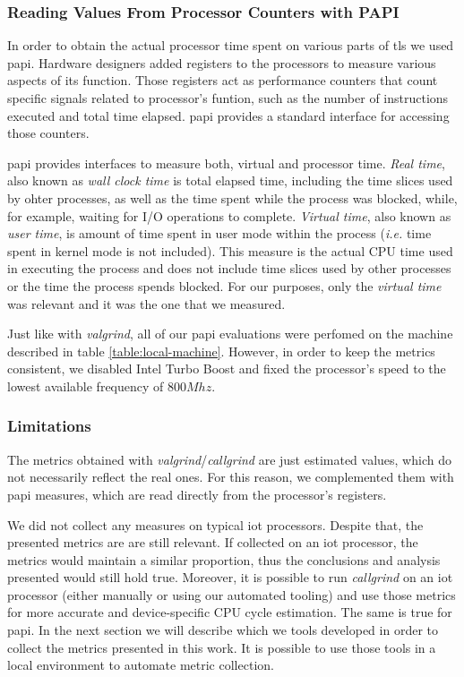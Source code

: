 \documentclass{llncs}
\begin{document}
\subsubsection{Reading Values From Processor Counters with PAPI}

In order to obtain the actual processor time spent on various parts of \gls{tls} 
we used \gls{papi}. Hardware designers added registers to the processors to measure various 
aspects of its function. Those registers act as performance counters that count specific
signals related to processor's funtion, such as the number of instructions executed and total
time elapsed. \gls{papi} provides a standard interface for accessing those counters.

\gls{papi} provides interfaces to measure both, virtual and processor time. \textit{Real time},
also known as \textit{wall clock time} is total elapsed time, including the time slices used
by ohter processes, as well as the time spent while the process was blocked, while, for example,
waiting for I/O operations to complete. \textit{Virtual time}, also known as \textit{user time},
is amount of time spent in user mode within the process (\textit{i.e.} time spent in kernel mode is not included). 
This measure is the actual CPU time used in executing the process and does not include time slices 
used by other processes or the time the process spends blocked. For our purposes, only the \textit{virtual time}
was relevant and it was the one that we measured.

Just like with \textit{valgrind}, all of our \gls{papi} evaluations were perfomed on the machine
described in table \ref{table:local-machine}. However, in order to keep the metrics consistent,
we disabled Intel Turbo Boost \cite{charles2009evaluation} and fixed the processor's speed to the lowest available frequency
of $800Mhz$.

\subsubsection{Limitations}

The metrics obtained with \textit{valgrind}/\textit{callgrind} are just estimated values, which do not
necessarily reflect the real ones. For this reason, we complemented them with \gls{papi} measures, which
are read directly from the processor's registers.

We did not collect any measures on typical \gls{iot} processors. Despite that, the presented metrics are are still
relevant. If collected on an \gls{iot} processor, the metrics would maintain a similar proportion, thus
the conclusions and analysis presented would still hold true. Moreover, it is possible to run \textit{callgrind}
on an \gls{iot} processor (either manually or using our automated tooling) and use those metrics for more accurate 
and device-specific CPU cycle estimation. The same is true for \gls{papi}. In the next section we will describe which we tools developed in order 
to collect the metrics presented in this work. It is possible to use those tools in a local environment to 
automate metric collection.
\end{document}
